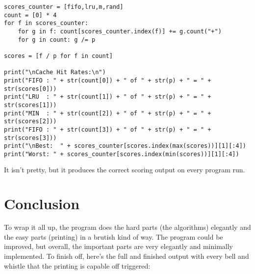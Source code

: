 \documentclass[11pt]{article}
\begin{document}
\begin{lstlisting}
scores_counter = [fifo,lru,m,rand]
count = [0] * 4
for f in scores_counter:
	for g in f: count[scores_counter.index(f)] += g.count("+")
	for g in count: g /= p

scores = [f / p for f in count]

print("\nCache Hit Rates:\n")
print("FIFO : " + str(count[0]) + " of " + str(p) + " = " + str(scores[0]))
print("LRU  : " + str(count[1]) + " of " + str(p) + " = " + str(scores[1]))
print("MIN  : " + str(count[2]) + " of " + str(p) + " = " + str(scores[2]))
print("FIFO : " + str(count[3]) + " of " + str(p) + " = " + str(scores[3]))
print("\nBest:  " + scores_counter[scores.index(max(scores))][1][:4])
print("Worst: " + scores_counter[scores.index(min(scores))][1][:4])
\end{lstlisting}

It isn't pretty, but it produces the correct scoring output on every program run.

\section{Conclusion}

To wrap it all up, the program does the hard parts (the algorithms) elegantly and the easy parts (printing) in a brutish kind of way.
The program could be improved, but overall, the important parts are very elegantly and minimally implemented.
To finish off, here's the full and finished output with every bell and whistle that the printing is capable off triggered:
\end{document}
